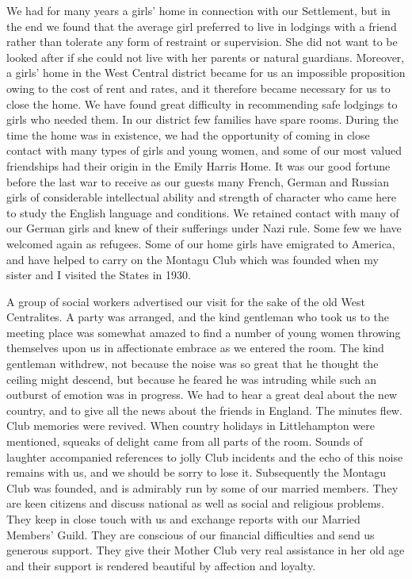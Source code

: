 We had for many years a girls’ home in connection
with our Settlement, but in the end we found that the
average girl preferred to live in lodgings with a friend
rather than tolerate any form of restraint or supervision.
She did not want to be looked after if she could not live
with her parents or natural guardians. Moreover, a girls’
home in the West Central district became for us an impossible
proposition owing to the cost of rent and rates,
and it therefore became necessary for us to close the
home. We have found great difficulty in recommending
safe lodgings to girls who needed them. In our district
few families have spare rooms. During the time the home
was in existence, we had the opportunity of coming in
close contact with many types of girls and young women,
and some of our most valued friendships had their origin
in the Emily Harris Home. It was our good fortune
before the last war to receive as our guests many French,
German and Russian girls of considerable intellectual
ability and strength of character who came here to study
the English language and conditions. We retained contact
with many of our German girls and knew of their
sufferings under Nazi rule. Some few we have welcomed
again as refugees. Some of our home girls have emigrated
to America, and have helped to carry on the Montagu
Club which was founded when my sister and I visited
the States in 1930.

A group of social workers advertised our visit for the
sake of the old West Centralites. A party was arranged,
and the kind gentleman who took us to the meeting place
was somewhat amazed to find a number of young women
throwing themselves upon us in affectionate embrace as
we entered the room. The kind gentleman withdrew,
not because the noise was so great that he thought the
ceiling might descend, but because he feared he was intruding
while such an outburst of emotion was in progress.
We had to hear a great deal about the new country,
and to give all the news about the friends in England.
The minutes flew. Club memories were revived.
When country holidays in Littlehampton were mentioned,
squeaks of delight came from all parts of the room.
Sounds of laughter accompanied references to jolly Club
incidents and the echo of this noise remains with us, and
we should be sorry to lose it. Subsequently the Montagu
Club was founded, and is admirably run by some of our
married members. They are keen citizens and discuss
national as well as social and religious problems.
They keep in close touch with us and exchange reports
with our Married Members’ Guild. They are conscious
of our financial difficulties and send us generous support.
They give their Mother Club very real assistance in her
old age and their support is rendered beautiful by
affection and loyalty.

